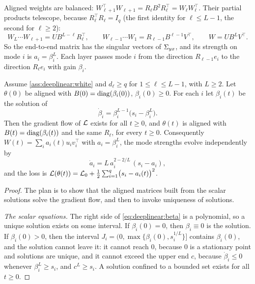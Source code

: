 \begin{refsection}
Aligned weights are balanced: $W_{\ell+1}^\top W_{\ell+1}=R_\ell B^2R_\ell^\top=W_\ell W_\ell^\top$. Their partial products telescope, because $R_\ell^\top R_\ell=I_q$ (the first identity for $\ell\le L-1$, the second for $\ell\ge2$):
\begin{equation}\label{eq:deeplinear:telescope}
  W_L\cdots W_{\ell+1}=UB^{L-\ell}R_\ell^\top,\qquad W_{\ell-1}\cdots W_1=R_{\ell-1}B^{\ell-1}V^\top,\qquad W=UB^LV^\top .
\end{equation}
So the end-to-end matrix has the singular vectors of $\Sigma_{yx}$, and its strength on mode $i$ is $a_i=\beta_i^L$. Each layer passes mode $i$ from the direction $R_{\ell-1}e_i$ to the direction $R_\ell e_i$ with gain $\beta_i$.

\begin{theorem}\label{thm:deeplinear:exact}
Assume \cref{ass:deeplinear:white} and $d_\ell\ge q$ for $1\le\ell\le L-1$, with $L\ge2$. Let $\theta(0)$ be aligned with $B(0)=\operatorname{diag}(\beta_i(0))$, $\beta_i(0)\ge0$. For each $i$ let $\beta_i(t)$ be the solution of
\begin{equation}\label{eq:deeplinear:beta}
  \dot\beta_i=\beta_i^{L-1}\bigl(s_i-\beta_i^L\bigr).
\end{equation}
Then the gradient flow of $\mathcal{L}$ exists for all $t\ge0$, and $\theta(t)$ is aligned with $B(t)=\operatorname{diag}(\beta_i(t))$ and the same $R_\ell$, for every $t\ge0$. Consequently $W(t)=\sum_ia_i(t)u_iv_i^\top$ with $a_i=\beta_i^L$, the mode strengths evolve independently by
\begin{equation}\label{eq:deeplinear:aode}
  \dot a_i=L\,a_i^{2-2/L}\,(s_i-a_i),
\end{equation}
and the loss is $\mathcal{L}(\theta(t))=\mathcal{L}_0+\frac12\sum_{i=1}^q\bigl(s_i-a_i(t)\bigr)^2$.
\end{theorem}

\begin{proof}
The plan is to show that the aligned matrices built from the scalar solutions solve the gradient flow, and then to invoke uniqueness of solutions.

\emph{The scalar equations.} The right side of \eqref{eq:deeplinear:beta} is a polynomial, so a unique solution exists on some interval. If $\beta_i(0)=0$, then $\beta_i\equiv0$ is the solution. If $\beta_i(0)>0$, then the interval $J_i=(0,\max\{\beta_i(0),s_i^{1/L}\}]$ contains $\beta_i(0)$, and the solution cannot leave it: it cannot reach $0$, because $0$ is a stationary point and solutions are unique, and it cannot exceed the upper end $c$, because $\dot\beta_i\le0$ whenever $\beta_i^L\ge s_i$, and $c^L\ge s_i$. A solution confined to a bounded set exists for all $t\ge0$.


\end{proof}
\end{refsection}

